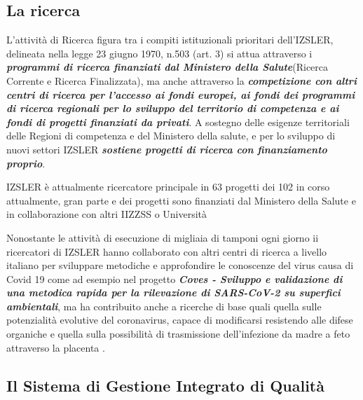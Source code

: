 \documentclass[
  12pt,
]{article}
\begin{document}
\hypertarget{la-ricerca}{%
\subsection{La ricerca}\label{la-ricerca}}

L'attività di Ricerca figura tra i compiti istituzionali prioritari
dell'IZSLER, delineata nella legge 23 giugno 1970, n.503 (art. 3) si
attua attraverso i \textbf{\emph{programmi di ricerca finanziati dal
Ministero della Salute}}(Ricerca Corrente e Ricerca Finalizzata), ma
anche attraverso la \textbf{\emph{competizione con altri centri di
ricerca per l'accesso ai fondi europei, ai fondi dei programmi di
ricerca regionali per lo sviluppo del territorio di competenza e ai
fondi di progetti finanziati da privati}}. A sostegno delle esigenze
territoriali delle Regioni di competenza e del Ministero della salute, e
per lo sviluppo di nuovi settori IZSLER \textbf{\emph{sostiene progetti
di ricerca con finanziamento proprio}}.

IZSLER è attualmente ricercatore principale in 63 progetti dei 102 in
corso attualmente, gran parte e dei progetti sono finanziati dal
Ministero della Salute e in collaborazione con altri IIZZSS o Università

Nonostante le attività di esecuzione di migliaia di tamponi ogni giorno
ii ricercatori di IZSLER hanno collaborato con altri centri di ricerca a
livello italiano per sviluppare metodiche e approfondire le conoscenze
del virus causa di Covid 19 come ad esempio nel progetto
\textbf{\emph{Coves - Sviluppo e validazione di una metodica rapida per
la rilevazione di SARS-CoV-2 su superfici ambientali}}, ma ha
contribuito anche a ricerche di base quali quella sulle potenzialità
evolutive del coronavirus, capace di modificarsi resistendo alle difese
organiche e quella sulla possibilità di trasmissione dell'infezione da
madre a feto attraverso la placenta .

\hypertarget{il-sistema-di-gestione-integrato-di-qualituxe0}{%
\subsection{Il Sistema di Gestione Integrato di
Qualità}\label{il-sistema-di-gestione-integrato-di-qualituxe0}}
\end{document}
